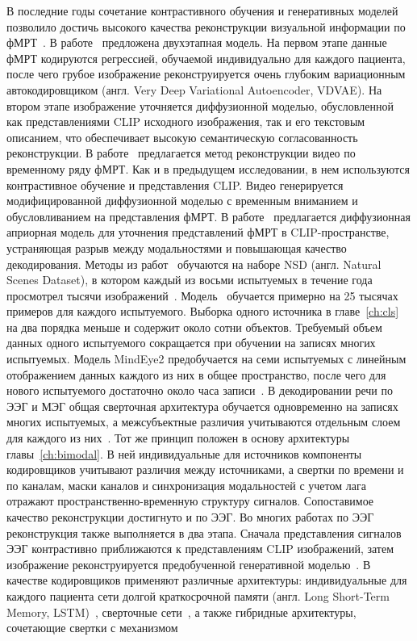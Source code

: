 В последние годы сочетание контрастивного обучения и генеративных моделей позволило достичь высокого качества реконструкции визуальной информации по фМРТ~\cite{huang2021fmri}. В работе~\cite{ozcelik2023naturalscenereconstructionfmri} предложена двухэтапная модель. На первом этапе данные фМРТ кодируются регрессией, обучаемой индивидуально для каждого пациента, после чего грубое изображение реконструируется очень глубоким вариационным автокодировщиком (англ. Very Deep Variational Autoencoder, VDVAE). На втором этапе изображение уточняется диффузионной моделью, обусловленной как представлениями CLIP исходного изображения, так и его текстовым описанием, что обеспечивает высокую семантическую согласованность реконструкции. В работе~\cite{chen2023cinematicmindscapeshighqualityvideo} предлагается метод реконструкции видео по временному ряду фМРТ. Как и в предыдущем исследовании, в нем используются контрастивное обучение и представления CLIP. Видео генерируется модифицированной диффузионной моделью с временным вниманием и обусловливанием на представления фМРТ. В работе~\cite{scotti2023reconstructingmindseyefmritoimage} предлагается диффузионная априорная модель для уточнения представлений фМРТ в CLIP-пространстве, устраняющая разрыв между модальностями и повышающая качество декодирования. Методы из работ~\cite{ozcelik2023naturalscenereconstructionfmri, scotti2023reconstructingmindseyefmritoimage} обучаются на наборе NSD (англ. Natural Scenes Dataset), в котором каждый из восьми испытуемых в течение года просмотрел тысячи изображений~\cite{allen2022massive}. Модель~\cite{scotti2023reconstructingmindseyefmritoimage} обучается примерно на 25 тысячах примеров для каждого испытуемого. Выборка одного источника в главе~\ref{ch:cls} на два порядка меньше и содержит около сотни объектов. Требуемый объем данных одного испытуемого сокращается при обучении на записях многих испытуемых. Модель MindEye2 предобучается на семи испытуемых с линейным отображением данных каждого из них в общее пространство, после чего для нового испытуемого достаточно около часа записи~\cite{scotti2024mindeye2}. В декодировании речи по ЭЭГ и МЭГ общая сверточная архитектура обучается одновременно на записях многих испытуемых, а межсубъектные различия учитываются отдельным слоем для каждого из них~\cite{defossez2023decoding}. Тот же принцип положен в основу архитектуры главы~\ref{ch:bimodal}. В ней индивидуальные для источников компоненты кодировщиков учитывают различия между источниками, а свертки по времени и по каналам, маски каналов и синхронизация модальностей с учетом лага отражают пространственно-временную структуру сигналов. Сопоставимое качество реконструкции достигнуто и по ЭЭГ. Во многих работах по ЭЭГ реконструкция также выполняется в два этапа. Сначала представления сигналов ЭЭГ контрастивно приближаются к представлениям CLIP изображений, затем изображение реконструируется предобученной генеративной моделью~\cite{Mishra2022, li2024visual, singh2023eeg2imageimagereconstructioneeg}. В качестве кодировщиков применяют различные архитектуры: индивидуальные для каждого пациента сети долгой краткосрочной памяти (англ. Long Short-Term Memory, LSTM)~\cite{singh2023eeg2imageimagereconstructioneeg}, сверточные сети~\cite{Mishra2022}, а также гибридные архитектуры, сочетающие свертки с механизмом 